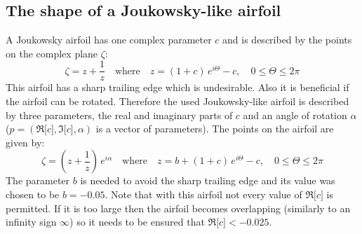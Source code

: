 \documentclass[12pt, a4paper]{article}
\begin{document}
\subsection{The shape of a Joukowsky-like airfoil}
A Joukowsky airfoil has one complex parameter $c$ and is described by the points on the complex plane $\zeta$:
\begin{equation}
\zeta = z + \frac{1}{z} \quad \text{where} \quad 
z = (1+c) \, e^{i \Theta} - c , \quad
0 \leq \Theta \leq 2 \pi
\end{equation}
This airfoil has a sharp trailing edge which is undesirable. Also it is beneficial if the airfoil can be rotated. Therefore the used Joukowsky-like airfoil is described by three parameters, the real and imaginary parts of $c$ and an angle of rotation $\alpha$ ($p = (\Re \lbrack c \rbrack, \Im \lbrack c \rbrack, \alpha)$ is a vector of parameters). The points on the airfoil are given by:
\begin{equation}
\zeta = \left( z + \frac{1}{z} \right) \, e^{i \alpha} \quad \text{where} \quad 
z = b + (1+c) \, e^{i \Theta} - c , \quad
0 \leq \Theta \leq 2 \pi
\end{equation}
The parameter $b$ is needed to avoid the sharp trailing edge and its value was chosen to be $b = -0.05$. Note that with this airfoil not every value of $\Re \lbrack c \rbrack$ is permitted. If it is too large then the airfoil becomes overlapping (similarly to an infinity sign $\infty$) so it needs to be ensured that $\Re \lbrack c \rbrack < -0.025$.
\end{document}
